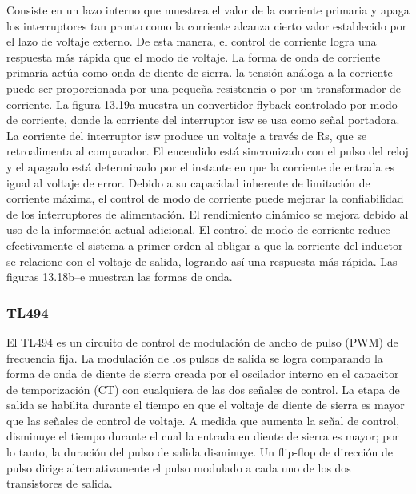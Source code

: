 Consiste en un lazo interno que muestrea el valor de la corriente primaria y apaga los interruptores tan pronto como la corriente alcanza cierto valor establecido por el lazo de voltaje externo. 
De esta manera, el control de corriente logra una respuesta más rápida que el modo de voltaje. 
La forma de onda de corriente primaria actúa como onda de diente de sierra. 
la tensión análoga a la corriente puede ser proporcionada por una pequeña resistencia o por un transformador de corriente. 
La figura 13.19a muestra un convertidor flyback controlado por modo de corriente, donde la corriente del interruptor isw se usa como señal portadora. 
La corriente del interruptor isw produce un voltaje a través de Rs, que se retroalimenta al comparador. 
El encendido está sincronizado con el pulso del reloj y el apagado está determinado por el instante en que la corriente de entrada es igual al voltaje de error.
Debido a su capacidad inherente de limitación de corriente máxima, el control de modo de corriente puede mejorar la confiabilidad de los interruptores de alimentación. El rendimiento dinámico se mejora debido al uso de la información actual adicional. El control de modo de corriente reduce efectivamente el sistema a primer orden al obligar a que la corriente del inductor se relacione con el voltaje de salida, logrando así una respuesta más rápida. Las figuras 13.18b–e muestran las formas de onda.


\subsubsection{TL494}

El TL494 es un circuito de control de modulación de ancho de pulso (PWM) de frecuencia fija. 
La modulación de los pulsos de salida se logra comparando la forma de onda de diente de sierra creada por el oscilador interno en el capacitor de temporización (CT) con cualquiera de las dos señales de control. 
La etapa de salida se habilita durante el tiempo en que el voltaje de diente de sierra es mayor que las señales de control de voltaje. 
A medida que aumenta la señal de control, disminuye el tiempo durante el cual la entrada en diente de sierra es mayor; por lo tanto, la duración del pulso de salida disminuye. 
Un flip-flop de dirección de pulso dirige alternativamente el pulso modulado a cada uno de los dos transistores de salida.

